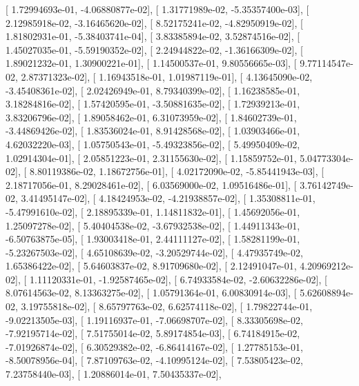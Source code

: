\documentclass{article}
\begin{document}
       [  1.72994693e-01,  -4.06880877e-02],
       [  1.31771989e-02,  -5.35357400e-03],
       [  2.12985918e-02,  -3.16465620e-02],
       [  8.52175241e-02,  -4.82950919e-02],
       [  1.81802931e-01,  -5.38403741e-04],
       [  3.83385894e-02,   3.52874516e-02],
       [  1.45027035e-01,  -5.59190352e-02],
       [  2.24944822e-02,  -1.36166309e-02],
       [  1.89021232e-01,   1.30900221e-01],
       [  1.14500537e-01,   9.80556665e-03],
       [  9.77114547e-02,   2.87371323e-02],
       [  1.16943518e-01,   1.01987119e-01],
       [  4.13645090e-02,  -3.45408361e-02],
       [  2.02426949e-01,   8.79340399e-02],
       [  1.16238585e-01,   3.18284816e-02],
       [  1.57420595e-01,  -3.50881635e-02],
       [  1.72939213e-01,   3.83206796e-02],
       [  1.89058462e-01,   6.31073959e-02],
       [  1.84602739e-01,  -3.44869426e-02],
       [  1.83536024e-01,   8.91428568e-02],
       [  1.03903466e-01,   4.62032220e-03],
       [  1.05750543e-01,  -5.49323856e-02],
       [  5.49950409e-02,   1.02914304e-01],
       [  2.05851223e-01,   2.31155630e-02],
       [  1.15859752e-01,   5.04773304e-02],
       [  8.80119386e-02,   1.18672756e-01],
       [  4.02172090e-02,  -5.85441943e-03],
       [  2.18717056e-01,   8.29028461e-02],
       [  6.03569000e-02,   1.09516486e-01],
       [  3.76142749e-02,   3.41495147e-02],
       [  4.18424953e-02,  -4.21938857e-02],
       [  1.35308811e-01,  -5.47991610e-02],
       [  2.18895339e-01,   1.14811832e-01],
       [  1.45692056e-01,   1.25097278e-02],
       [  5.40404538e-02,  -3.67932538e-02],
       [  1.44911343e-01,  -6.50763875e-05],
       [  1.93003418e-01,   2.44111127e-02],
       [  1.58281199e-01,  -5.23267503e-02],
       [  4.65108639e-02,  -3.20529744e-02],
       [  4.47935749e-02,   1.65386422e-02],
       [  5.64603837e-02,   8.91709680e-02],
       [  2.12491047e-01,   4.20969212e-02],
       [  1.11120331e-01,  -1.92587465e-02],
       [  6.74933584e-02,  -2.60632286e-02],
       [  8.07614563e-02,   8.13363275e-02],
       [  1.05791364e-01,   6.00830914e-03],
       [  5.62608894e-02,   3.19755818e-02],
       [  8.65797763e-02,   6.62574118e-02],
       [  1.79822744e-01,  -9.02213505e-03],
       [  1.19116937e-01,  -7.06698707e-02],
       [  8.33305698e-02,  -7.92195714e-02],
       [  7.51755014e-02,   5.89174854e-03],
       [  6.74184915e-02,  -7.01926874e-02],
       [  6.30529382e-02,  -6.86414167e-02],
       [  1.27785153e-01,  -8.50078956e-04],
       [  7.87109763e-02,  -4.10995124e-02],
       [  7.53805423e-02,   7.23758440e-03],
       [  1.20886014e-01,   7.50435337e-02],
\end{document}
